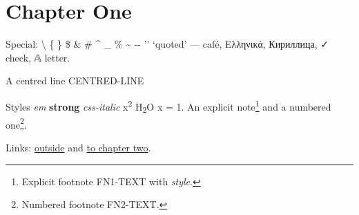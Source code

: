 \documentclass[11pt,openany,oneside]{book}
\begin{document}
\begin{titlepage}
\AddToShipoutPictureBG*{\AtPageCenter{\makebox[0pt]{\raisebox{-0.5\height}{\rule{2pt}{2pt}}}}}
\mbox{}
\end{titlepage}
\tableofcontents\clearpage

\clearpage{}
{}
\chapter*{Chapter One}
Special: \textbackslash{} \{ \} \$ \& \# \textasciicircum{} \_ \% \textasciitilde{} -{}- \textasciigrave{}\textasciigrave{} '{}' ‘quoted’ — café, Ελληνικά, Кириллица, ✓ check, 𝔸 letter.

{\centering A centred line CENTRED-LINE

}
Styles {\em em\/} {\bfseries strong} {\itshape css-italic\/} x\textsuperscript{2} H\textsubscript{2}O   {\ttfamily x = 1}. An explicit note\footnote{Explicit footnote FN1-TEXT with {\em style\/}.} and a numbered one\leavevmode\hypertarget{d1.r2}{}\footnote{\leavevmode\hypertarget{d1.fn2}{}Numbered footnote FN2-TEXT.}.

Links: \href{https://example.com/a\%20b?x=1&y=2\#frag}{outside} and \hyperlink{d2.target}{to chapter two}.
\end{document}
